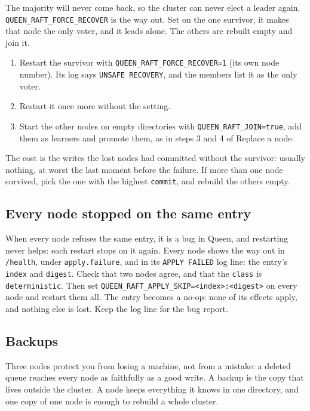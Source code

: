 The majority will never come back, so the cluster can never elect a leader again.
\texttt{QUEEN\_RAFT\_FORCE\_RECOVER} is the way out. Set on the one survivor, it makes that node
the only voter, and it leads alone. The others are rebuilt empty and join it.

\begin{enumerate}
\item Restart the survivor with \texttt{QUEEN\_RAFT\_FORCE\_RECOVER=1} (its own node number). Its
log says \texttt{UNSAFE RECOVERY}, and the members list it as the only voter.
\item Restart it once more without the setting.
\item Start the other nodes on empty directories with \texttt{QUEEN\_RAFT\_JOIN=true}, add them as
learners and promote them, as in steps 3 and 4 of Replace a node.
\end{enumerate}

The cost is the writes the lost nodes had committed without the survivor: usually nothing, at worst
the last moment before the failure. If more than one node survived, pick the one with the highest
\texttt{commit}, and rebuild the others empty.

\subsection{Every node stopped on the same entry}

When every node refuses the same entry, it is a bug in Queen, and restarting never helps: each
restart stops on it again. Every node shows the way out in \texttt{/health}, under
\texttt{apply.failure}, and in its \texttt{APPLY FAILED} log line: the entry's \texttt{index} and
\texttt{digest}. Check that two nodes agree, and that the \texttt{class} is
\texttt{deterministic}. Then set \texttt{QUEEN\_RAFT\_APPLY\_SKIP=<index>:<digest>} on every node and
restart them all. The entry becomes a no-op: none of its effects apply, and nothing else is lost.
Keep the log line for the bug report.

\subsection{Backups}

Three nodes protect you from losing a machine, not from a mistake: a deleted queue reaches every
node as faithfully as a good write. A backup is the copy that lives outside the cluster. A node
keeps everything it knows in one directory, and one copy of one node is enough to rebuild a whole
cluster.

